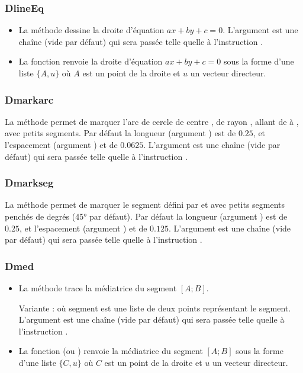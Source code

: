 \subsubsection{DlineEq}
\begin{itemize}
    \item La méthode  dessine la droite d'équation \(ax+by+c=0\). L'argument  est une chaîne (vide par défaut) qui sera passée telle quelle à l'instruction \drawcmd. \arguScale
    \item La fonction  renvoie la droite d'équation \(ax+by+c=0\) sous la forme d'une liste $\{A,u\}$ où $A$ est un point de la droite et $u$ un vecteur directeur.
\end{itemize}

\subsubsection{Dmarkarc}
La méthode  permet de marquer l'arc de cercle de centre , de rayon , allant de  à , avec  petits segments. Par défaut la longueur (argument ) est de $0.25$, et l'espacement (argument ) et de $0.0625$. L'argument  est une chaîne (vide par défaut) qui sera passée telle quelle à l'instruction \drawcmd.

\subsubsection{Dmarkseg}
La méthode  permet de marquer le segment défini par  et  avec  petits segments penchés de  degrés (45° par défaut). Par défaut la longueur (argument ) est de $0.25$, et l'espacement (argument ) et de $0.125$. L'argument  est une chaîne (vide par défaut) qui sera passée telle quelle à l'instruction \drawcmd.

\subsubsection{Dmed}
\begin{itemize}
    \item La méthode  trace la médiatrice du segment $[A;B]$.

  Variante :  où segment est une liste de deux points représentant le segment. L'argument  est une chaîne (vide par défaut) qui sera passée telle quelle à l'instruction \drawcmd. \arguScale
  \item La fonction  (ou ) renvoie la médiatrice du segment $[A;B]$ sous la forme d'une liste $\{C,u\}$ où $C$ est un point de la droite et $u$ un vecteur directeur.
\end{itemize}

